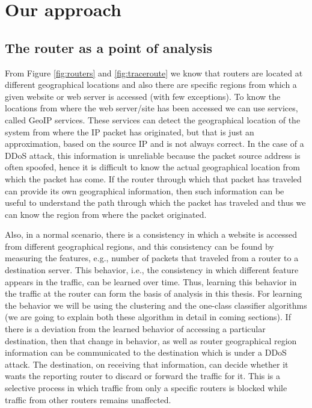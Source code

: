 \documentclass[12pt,oneside,a4paper]{article}
\begin{document}
\section{Our approach}

\subsection{The router as a point of analysis}
From Figure \ref{fig:routers} and \ref{fig:traceroute} we know that routers are located at different geographical locations and also there are specific regions from which a given website or web server is accessed (with few exceptions). To know the locations from where the web server/site has been accessed we can use services, called GeoIP services. These services can detect the geographical location of the system from where the IP packet has originated, but that is just an approximation, based on the source IP and is not always correct. In the case of a DDoS attack, this information is unreliable because the packet source address is often spoofed, hence it is difficult to know the actual geographical location from which the packet has come. If the router through which that packet has traveled can provide its own geographical information, then such information can be useful to understand the path through which the packet has traveled and thus we can know the region from where the packet originated.\par

Also, in a normal scenario, there is a consistency in which a website is accessed from different geographical regions, and this consistency can be found by measuring the features, e.g., number of packets that traveled from a router to a destination server. This behavior, i.e., the consistency in which different feature appears in the traffic, can be learned over time. Thus, learning this behavior in the traffic at the router can form the basis of analysis in this thesis. For learning the behavior we will be using the clustering and the one-class classifier algorithms (we are going to explain both these algorithm in detail in coming sections). If there is a deviation from the learned behavior of accessing a particular destination, then that change in behavior, as well as router geographical region information can be communicated to the destination which is under a DDoS attack. The destination, on receiving that information, can decide whether it wants the reporting router to discard or forward the traffic for it. This is a selective process in which traffic from only a specific routers is blocked while traffic from other routers remains unaffected.
\end{document}
